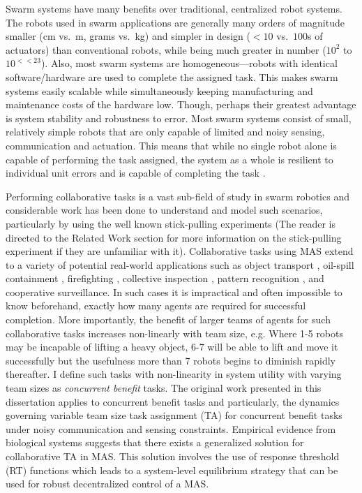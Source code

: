 \documentclass[defaultstyle,12pt]{thesis}
\begin{document}
Swarm systems have many benefits over traditional, centralized robot systems. The robots used in swarm applications are generally many orders of magnitude smaller (cm vs.~m, grams vs.~kg) and simpler in design ($<10$ vs.~$100$s of actuators) than conventional robots, while being much greater in number ($10^2$ to $10^{<<23}$). Also, most swarm systems are homogeneous---robots with identical software/hardware are used to complete the assigned task. This makes swarm systems easily scalable while simultaneously keeping manufacturing and maintenance costs of the hardware low. Though, perhaps their greatest advantage is system stability and robustness to error. Most swarm systems consist of small, relatively simple robots that are only capable of limited and noisy sensing, communication and actuation. This means that while no single robot alone is capable of performing the task assigned, the system as a whole is resilient to individual unit errors and is capable of completing the task \cite{Winfield2005}.

Performing collaborative tasks is a vast sub-field of study in swarm robotics and considerable work has been done to understand and model such scenarios, particularly by \cite{Martinoli1995, Martinoli1999b, Agassounon2001, Ijspeert2001, Agassounon2002} using the well known stick-pulling experiments (The reader is directed to the Related Work section for more information on the stick-pulling experiment if they are unfamiliar with it). Collaborative tasks using MAS extend to a variety of potential real-world applications such as object transport \cite{Sugawara2012}, oil-spill containment \cite{Beni2005}, firefighting \cite{Kanakia2014}, collective inspection \cite{Correll2007}, pattern recognition \cite{Beni1993}, and cooperative surveillance. In such cases it is impractical and often impossible to know beforehand, exactly how many agents are required for successful completion. More importantly, the benefit of larger teams of agents for such collaborative tasks increases non-linearly with team size, e.g. Where 1-5 robots may be incapable of lifting a heavy object, 6-7 will be able to lift and move it successfully but the usefulness more than 7 robots begins to diminish rapidly thereafter. I define such tasks with non-linearity in system utility with varying team sizes as \emph{concurrent benefit} tasks. The original work presented in this dissertation applies to concurrent benefit tasks and particularly, the dynamics governing variable team size task assignment (TA) for concurrent benefit tasks under noisy communication and sensing constraints. Empirical evidence from biological systems suggests that there exists a generalized solution for collaborative TA in MAS. This solution involves the use of response threshold (RT) functions which leads to a system-level equilibrium strategy that can be used for robust decentralized control of a MAS.
\end{document}
